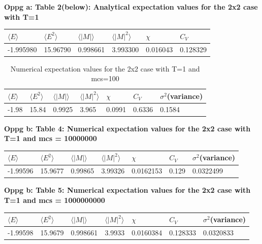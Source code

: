 \documentclass[twocolumn]{article}
\begin{document}
\textbf{Oppg a: Table 2(below): Analytical expectation values for the 2x2 case with T=1}
\newline
\centering
\bigskip
\resizebox{3cm} {
\begin{tabular}{|| l | l | l | l | l | l ||}
    \hline
    $\langle E \rangle$ & $\langle E^2 \rangle$ & $\langle |M| \rangle$ & $\langle |M|^2 \rangle$ & $\chi$ & $C_V$\\
    \hline 
    -1.995980 & 15.96790 & 0.998661 & 3.993300 & 0.016043 & 0.128329 \\
    \hline
\end{tabular}
}


\newpage

\begin{table}
\centering
\caption{Numerical expectation values for the 2x2 case with T=1 and mcs=100}
\begin{tabular}{l | l | l | l | l | l | l}
    \hline
    \hline
    $\langle E \rangle$ & $\langle E^2 \rangle$ & $\langle |M| \rangle$ & $\langle |M|^2 \rangle$ & $\chi$ & $C_V$ & $\sigma^2$(variance)\\
    \hline 
    -1.98 & 15.84 & 0.9925 & 3.965 & 0.0991 & 0.6336 & 0.1584 \\
    \hline
    \hline
\end{tabular}
\end{table}
\centering
\textbf{Oppg b: Table 4: Numerical expectation values for the 2x2 case with T=1 and mcs = 10000000}
\newline
\bigskip
\resizebox{3cm} {
\begin{tabular}{|| l | l | l | l | l | l | l ||}
    \centering
    \hline
    $\langle E \rangle$ & $\langle E^2 \rangle$ & $\langle |M| \rangle$ & $\langle |M|^2 \rangle$ & $\chi$ & $C_V$ & $\sigma^2$(variance)\\
    \hline 
    -1.99596 & 15.9677 & 0.99865 & 3.99326 & 0.0162153 & 0.129 & 0.0322499 \\
    \hline
\end{tabular}
}
\centering
\textbf{Oppg b: Table 5: Numerical expectation values for the 2x2 case with T=1 and mcs = 1000000000}
\newline
\centering
\bigskip

\resizebox{3cm} {
\begin{tabular}{|| l | l | l | l | l | l | l ||}
    \hline
    $\langle E \rangle$ & $\langle E^2 \rangle$ & $\langle |M| \rangle$ & $\langle |M|^2 \rangle$ & $\chi$ & $C_V$ & $\sigma^2$(variance)\\
    \hline 
    -1.99598 & 15.9679 & 0.998661 & 3.9933 & 0.0160384 & 0.128333 & 0.0320833 \\
    \hline
\end{tabular}
}
\end{document}
